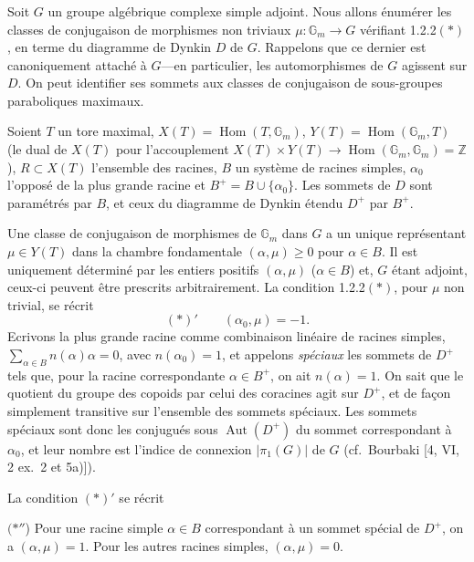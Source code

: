 \documentclass[12pt,a4paper]{article}
\theoremstyle{plain}
\theoremstyle{definition}
\theoremstyle{remark}
\DeclareMathOperator{\Hom}{Hom}
\DeclareMathOperator{\Aut}{Aut}
\newcommand{\ZZ}{\mathbb{Z}}
\newcommand{\Gm}{\mathbb{G}}
\begin{document}
\subsubsection{}

Soit $G$ un groupe alg\'ebrique complexe simple adjoint. Nous allons \'enum\'erer les classes de conjugaison de morphismes non triviaux $\mu:\Gm_m \to G$ v\'erifiant 1.2.2$(*)$, en terme du diagramme de Dynkin $D$ de $G$. Rappelons que ce dernier est canoniquement attach\'e \`a $G$---en particulier, les automorphismes de $G$ agissent sur $D$. On peut identifier ses sommets aux classes de conjugaison de sous-groupes paraboliques maximaux.

Soient $T$ un tore maximal, $X(T) = \Hom(T,\Gm_m)$, $Y(T) = \Hom(\Gm_m,T)$ (le dual de $X(T)$ pour l'accouplement $X(T) \times Y(T) \to \Hom(\Gm_m,\Gm_m) = \ZZ$), $R \subset X(T)$ l'ensemble des racines, $B$ un syst\`eme de racines simples, $\alpha_0$ l'oppos\'e de la plus grande racine et $B^+ = B \cup \{\alpha_0\}$. Les sommets de $D$ sont param\'etr\'es par $B$, et ceux du diagramme de Dynkin \'etendu $D^+$ par $B^+$.

Une classe de conjugaison de morphismes de $\Gm_m$ dans $G$ a un unique repr\'esentant $\mu \in Y(T)$ dans la chambre fondamentale $(\alpha,\mu) \ge 0$ pour $\alpha \in B$. Il est uniquement d\'etermin\'e par les entiers positifs $(\alpha,\mu)$ ($\alpha \in B$) et, $G$ \'etant adjoint, ceux-ci peuvent \^etre prescrits arbitrairement. La condition 1.2.2$(*)$, pour $\mu$ non trivial, se r\'ecrit
\[
(*)' \qquad (\alpha_0,\mu) = -1.
\]
Ecrivons la plus grande racine comme combinaison lin\'eaire de racines simples, $\sum_{\alpha \in B} n(\alpha)\alpha = 0$, avec $n(\alpha_0) = 1$, et appelons \textit{sp\'eciaux} les sommets de $D^+$ tels que, pour la racine correspondante $\alpha \in B^+$, on ait $n(\alpha) = 1$. On sait que le quotient du groupe des copoids par celui des coracines agit sur $D^+$, et de fa\c{c}on simplement transitive sur l'ensemble des sommets sp\'eciaux. Les sommets sp\'eciaux sont donc les conjugu\'es sous $\Aut(D^+)$ du sommet correspondant \`a $\alpha_0$, et leur nombre est l'indice de connexion $|\pi_1(G)|$ de $G$ (cf.~Bourbaki [4, VI, 2 ex.~2 et 5a)]).

La condition $(*)'$ se r\'ecrit

$(*''$) Pour une racine simple $\alpha \in B$ correspondant \`a un sommet sp\'ecial de $D^+$, on a $(\alpha,\mu) = 1$. Pour les autres racines simples, $(\alpha,\mu) = 0$.

\subsubsection{}
\end{document}
